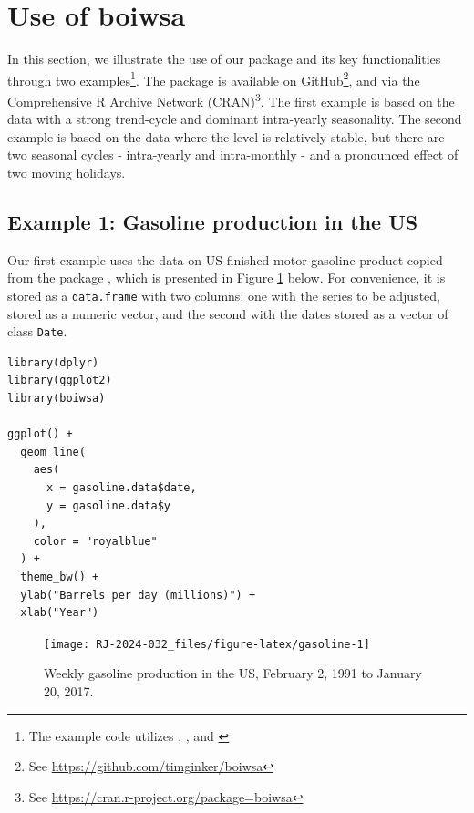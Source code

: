 \hypertarget{use-of-boiwsa}{%
\section{Use of boiwsa}\label{use-of-boiwsa}}

In this section, we illustrate the use of our package and its key functionalities through two examples\footnote{The example code utilizes  \citep{dplyr},  \citep{ggplot2manual}, and  \citep{gridExtra}}. The package is available on GitHub\footnote{See \url{https://github.com/timginker/boiwsa}}, and via the Comprehensive R Archive Network (CRAN)\footnote{See \url{https://cran.r-project.org/package=boiwsa}}. The first example is based on the data with a strong trend-cycle and dominant intra-yearly seasonality. The second example is based on the data where the level is relatively stable, but there are two seasonal cycles - intra-yearly and intra-monthly - and a pronounced effect of two moving holidays.

\hypertarget{example-1-gasoline-production-in-the-us}{%
\subsection{Example 1: Gasoline production in the US}\label{example-1-gasoline-production-in-the-us}}

Our first example uses the data on US finished motor gasoline product copied from the  package \citep{fpp2}, which is presented in Figure \ref{fig:gasoline} below. For convenience, it is stored as a \texttt{data.frame} with two columns: one with the series to be adjusted, stored as a numeric vector, and the second with the dates stored as a vector of class \texttt{Date}.

\begin{verbatim}
library(dplyr)
library(ggplot2)
library(boiwsa)

ggplot() +
  geom_line(
    aes(
      x = gasoline.data$date,
      y = gasoline.data$y
    ),
    color = "royalblue"
  ) +
  theme_bw() +
  ylab("Barrels per day (millions)") +
  xlab("Year")
\end{verbatim}

\begin{figure}[H]

{\centering \texttt{[image: RJ-2024-032\_files/figure-latex/gasoline-1]} 

}

\caption{Weekly gasoline production in the US, February 2, 1991 to January 20, 2017.}\label{fig:gasoline}
\end{figure}

